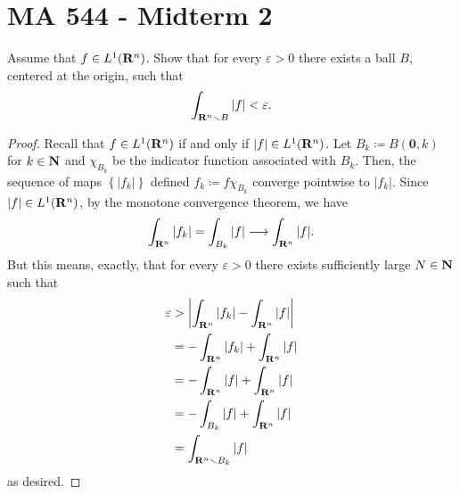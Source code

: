 \section{MA 544 - Midterm 2}
\begin{problem}
Assume that $f\in L^1(\mathbf{R}^n)$. Show that for every $\varepsilon>0$ there
exists a ball $B$, centered at the origin, such that
\[
\int_{\mathbf{R}^n\smallsetminus B}|f|<\varepsilon.
\]
\end{problem}
\begin{proof}
Recall that $f\in L^1(\mathbf{R}^n)$ if and only if $|f|\in
L^1(\mathbf{R}^n)$. Let $B_k\coloneqq B(\mathbf{0},k)$ for $k\in\mathbf{N}$ and
$\chi_{B_k}$ be the indicator function associated with $B_k$. Then, the
sequence of maps $\left\{|f_k|\right\}$ defined $f_k\coloneqq f\chi_{B_k}$
converge pointwise to $|f_k|$. Since $|f|\in L^1(\mathbf{R}^n)$, by the monotone
convergence theorem, we have
\begin{equation}
\label{eq:monotonicity-2-1}
\int_{\mathbf{R}^n} |f_k|=\int_{B_k}|f|\longrightarrow\int_{\mathbf{R}^n}|f|.
\end{equation}
But this means, exactly, that for every $\varepsilon>0$ there exists
sufficiently large $N\in\mathbf{N}$ such that
\begin{equation}
\label{eq:desired-inequality-2-1}
\begin{aligned}
\varepsilon&>\left|\int_{\mathbf{R}^n}|f_k|-\int_{\mathbf{R}^n}|f|\right|\\
&=-\int_{\mathbf{R}^n}|f_k|+\int_{\mathbf{R}^n}|f|\\
&=-\int_{\mathbf{R}^n}|f|+\int_{\mathbf{R}^n}|f|\\
&=-\int_{B_k}|f|+\int_{\mathbf{R}^n}|f|\\
&=\int_{\mathbf{R}^n\smallsetminus B_k}|f|
\end{aligned}
\end{equation}
as desired.
\end{proof}

